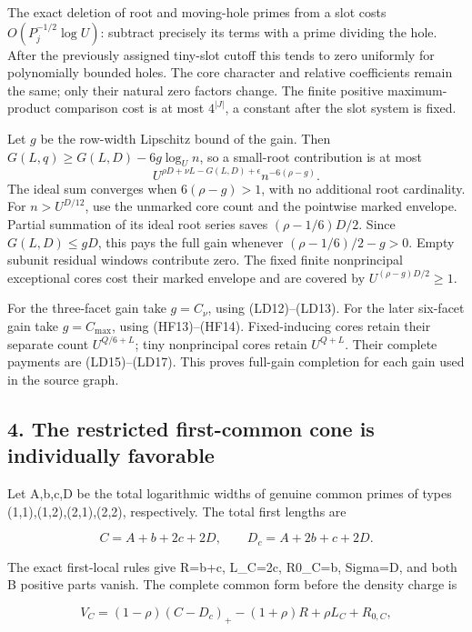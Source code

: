 The exact deletion of root and moving-hole primes from a slot costs \(O(P_j^{-1/2}\log U)\): subtract precisely its terms with a prime dividing the hole. After the previously assigned tiny-slot cutoff this tends to zero uniformly for polynomially bounded holes. The core character and relative coefficients remain the same; only their natural zero factors change. The finite positive maximum-product comparison cost is at most \(4^{|J|}\), a constant after the slot system is fixed.

Let \(g\) be the row-width Lipschitz bound of the gain. Then \(G(L,q)\ge G(L,D)-6g\log_U n\), so a small-root contribution is at most \[
 U^{\rho D+\nu L-G(L,D)+\epsilon}n^{-6(\rho-g)}.
 \tag{RT1}
\] The ideal sum converges when \(6(\rho-g)>1\), with no additional root cardinality. For \(n>U^{D/12}\), use the unmarked core count and the pointwise marked envelope. Partial summation of its ideal root series saves \((\rho-1/6)D/2\). Since \(G(L,D)\le gD\), this pays the full gain whenever \((\rho-1/6)/2-g>0\). Empty subunit residual windows contribute zero. The fixed finite nonprincipal exceptional cores cost their marked envelope and are covered by \(U^{(\rho-g)D/2}\ge1\).

For the three-facet gain take \(g=C_\nu\), using (LD12)--(LD13). For the later six-facet gain take \(g=C_{\max}\), using (HF13)--(HF14). Fixed-inducing cores retain their separate count \(U^{Q/6+L}\); tiny nonprincipal cores retain \(U^{Q+L}\). Their complete payments are (LD15)--(LD17). This proves full-gain completion for each gain used in the source graph.

\hypertarget{sources:the-restricted-first-common-cone-is-individually-favorable}{%
\subsection{4. The restricted first-common cone is individually favorable}\label{sources:the-restricted-first-common-cone-is-individually-favorable}}

Let A,b,c,D be the total logarithmic widths of genuine common primes of types (1,1),(1,2),(2,1),(2,2), respectively. The total first lengths are

\[
 C=A+b+2c+2D,\qquad D_c=A+2b+c+2D.
\]

The exact first-local rules give R=b+c, L\_\allowbreak{}C=2c, R0\_\allowbreak{}C=b, Sigma=D, and both B positive parts vanish. The complete common form before the density charge is

\[
 V_C=(1-\rho)(C-D_c)_+-(1+\rho)R+\rho L_C+R_{0,C},
\]

